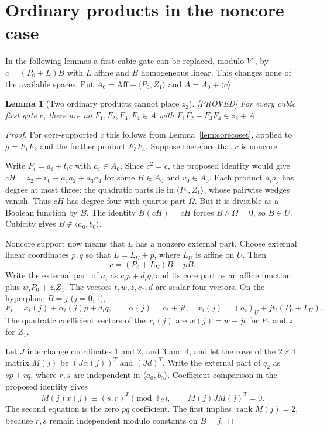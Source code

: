 \documentclass[11pt,a4paper]{article}
\newtheorem{lemma}[theorem]{Lemma}
\newcommand{\Aff}{\mathrm{Aff}}
\newcommand{\rk}{\operatorname{rank}}
\newcommand{\status}[1]{\hfill\textsf{[#1]}}
\begin{document}
\section{Ordinary products in the noncore case}
In the following lemmas a first cubic gate can be replaced, modulo $V_1$, by $c=(P_0+L)B$ with $L$ affine and $B$ homogeneous linear. This changes none of the available spaces. Put $A_0=\Aff+\langle P_0,Z_1\rangle$ and $A=A_0+\langle c\rangle$.

\begin{lemma}[Two ordinary products cannot place $z_2$]\label{lem:ordinarypair}\status{PROVED}
For every cubic first gate $c$, there are no $F_1,F_2,F_3,F_4\in A$ with $F_1F_2+F_3F_4\in z_2+A$.
\end{lemma}
\begin{proof}
For core-supported $c$ this follows from Lemma~\ref{lem:corecoset}, applied to $g=F_1F_2$ and the further product $F_3F_4$. Suppose therefore that $c$ is noncore.

Write $F_i=a_i+t_i c$ with $a_i\in A_0$. Since $c^2=c$, the proposed identity would give $cH=z_2+v_0+a_1a_2+a_3a_4$ for some $H\in A_0$ and $v_0\in A_0$. Each product $a_i a_j$ has degree at most three: the quadratic parts lie in $\langle P_0,Z_1\rangle$, whose pairwise wedges vanish. Thus $cH$ has degree four with quartic part $\Omega$. But it is divisible as a Boolean function by $B$. The identity $B(cH)=cH$ forces $B\wedge\Omega=0$, so $B\in U$. Cubicity gives $B\notin\langle a_0,b_0\rangle$.

Noncore support now means that $L$ has a nonzero external part. Choose external linear coordinates $p,q$ so that $L=L_U+p$, where $L_U$ is affine on $U$. Then
\[
c=(P_0+L_U)B+pB.
\]
Write the external part of $a_i$ as $c_i p+d_iq$, and its core part as an affine function plus $w_iP_0+z_iZ_1$. The vectors $t,w,z,c_*,d$ are scalar four-vectors. On the hyperplane $B=j$ ($j=0,1$),
\[
F_i=x_i(j)+\alpha_i(j)p+d_iq,\qquad
\alpha(j)=c_*+jt,\quad
x_i(j)=(a_i)_U+jt_i(P_0+L_U).
\]
The quadratic coefficient vectors of the $x_i(j)$ are $w(j)=w+jt$ for $P_0$ and $z$ for $Z_1$.

Let $J$ interchange coordinates 1 and 2, and 3 and 4, and let the rows of the $2\times4$ matrix $M(j)$ be $(J\alpha(j))^T$ and $(Jd)^T$. Write the external part of $q_2$ as $sp+rq$, where $r,s$ are independent in $\langle a_0,b_0\rangle$. Coefficient comparison in the proposed identity gives
\[
M(j)x(j)\equiv(s,r)^T\pmod{\mathbb F_2},\qquad
M(j)JM(j)^T=0.
\]
The second equation is the zero $pq$ coefficient. The first implies $\rk M(j)=2$, because $r,s$ remain independent modulo constants on $B=j$.


\end{proof}
\end{document}
